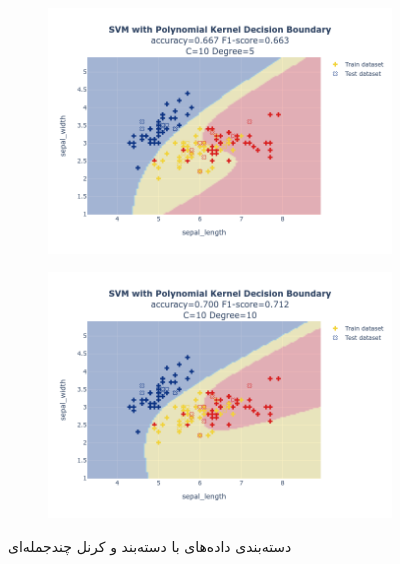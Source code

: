 \documentclass{article}
\begin{document}
\begin{figure}
\begin{subfigure}{0.3\textwidth}
        \includegraphics[scale=.13]{images/implementation/q1/polynomial_kernel/sepal_length_sepal_width_10_5.png}
    \end{subfigure}
    \hfill
    \begin{subfigure}{0.3\textwidth}
        \centering
        \includegraphics[scale=.13]{images/implementation/q1/polynomial_kernel/sepal_length_sepal_width_10_10.png}
    \end{subfigure}
    \caption{دسته‌بندی داده‌های  با دسته‌بند  و کرنل چندجمله‌ای}
    \label{polynomial_kernel}
\end{figure}

\newpage
\end{document}
